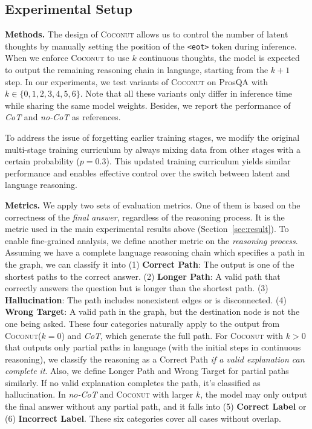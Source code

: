 \documentclass[]{fairmeta}
\newcommand{\ours}{\textsc{Coconut}\xspace}
\begin{document}
\subsection{Experimental Setup}
\label{sec:search_setup}
\noindent\textbf{Methods.} 
The design of \ours allows us to control the number of latent thoughts by manually setting the position of the \texttt{<eot>} token during inference. When we enforce \ours to use $k$ continuous thoughts, the model is expected to output the remaining reasoning chain in language, starting from the $k+1$ step. In our experiments, we test variants of \ours on ProsQA with $k \in \{0, 1, 2, 3, 4, 5, 6\}$. Note that all these variants only differ in inference time while sharing the same model weights. Besides, we report the performance of \textit{CoT} and \textit{no-CoT} as references. 

To address the issue of forgetting earlier training stages, we modify the original multi-stage training curriculum by always mixing data from other stages with a certain probability ($p=0.3$). This updated training curriculum yields similar performance and enables effective control over the switch between latent and language reasoning.

\noindent\textbf{Metrics.} We apply two sets of evaluation metrics. One of them is based on the correctness of the \textit{final answer}, regardless of the reasoning process. It is the metric used in the main experimental results above (Section~\ref{sec:result}). To enable fine-grained analysis, we define another metric on the \textit{reasoning process}. Assuming we have a complete language reasoning chain which specifies a path in the graph, we can classify it into (1) \textbf{Correct Path}: The output is one of the shortest paths to the correct answer. (2) \textbf{Longer Path}: A valid path that correctly answers the question but is longer than the shortest path. (3) \textbf{Hallucination}: The path includes nonexistent edges or is disconnected. (4) \textbf{Wrong Target}: A valid path in the graph, but the destination node is not the one being asked. These four categories naturally apply to the output from  \ours ($k=0$) and \textit{CoT}, which generate the full path. For \ours with $k>0$ that outputs only partial paths in language (with the initial steps in continuous reasoning), we classify the reasoning as a Correct Path \textit{if a valid explanation can complete it}. Also, we define Longer Path and Wrong Target for partial paths similarly. If no valid explanation completes the path, it’s classified as hallucination. In \textit{no-CoT} and \ours with larger $k$, the model may only output the final answer without any partial path, and it falls into (5) \textbf{Correct Label} or (6) \textbf{Incorrect Label}. These six categories cover all cases without overlap.
\end{document}
